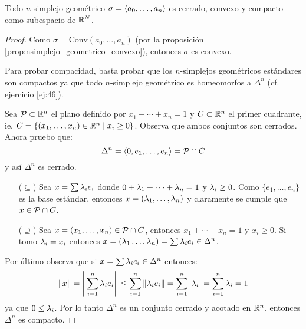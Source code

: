 \begin{ejercicio}\label{ej:45}
  Todo $n$-simplejo geom\'etrico $\sigma=\langle a_0,\ldots,a_n \rangle$ es cerrado, convexo y compacto
  como subespacio de $\mathbb{R}^N$.
\end{ejercicio}
\begin{proof}%
  Como $\sigma=\text{Conv}(a_0,\ldots,a_n)$ (por la proposici\'on \ref{prop:nsimplejo_geometrico_convexo}),
  entonces $\sigma$ es convexo.

  Para probar compacidad, basta probar que los $n$-simplejos geom\'etricos est\'andares son compactos
  ya que todo $n$-simplejo geom\'etrico es homeomorfos a $\Delta^n$ (cf. ejercicio \ref{ej:46}).

  Sea $\mathcal{P}\subset\mathbb{R}^n$ el plano definido por $x_1+\cdots+x_n=1$ y $C\subset\mathbb{R}^n$ el primer cuadrante,
  ie. $C=\{(x_1,\ldots,x_n)\in\mathbb{R}^n\mid x_i\geq 0\}$. Observa que ambos conjuntos son cerrados. Ahora
  pruebo que:
  \[
    \Delta^n=\langle 0,e_1,\ldots,e_n \rangle=\mathcal{P}\cap C
  \]
  y as\'i $\Delta^n$ es cerrado.
  \begin{enumerate}
  \item[($\subseteq$)] Sea $x=\sum\lambda_ie_i$ donde $0+\lambda_1+\cdots+\lambda_n=1$ y $\lambda_i\geq 0$. Como
    $\{e_1,\ldots,e_n\}$ es la base est\'andar, entonces $x=(\lambda_1,\ldots,\lambda_n)$ y claramente se
    cumple que $x\in\mathcal{P}\cap C$.
  \item[($\supseteq$)] Sea $x=(x_1,\ldots,x_n)\in\mathcal{P}\cap C$, entonces $x_1+\cdots+x_n=1$ y $x_i\geq 0$.
    Si tomo $\lambda_i=x_i$ entonces $x=(\lambda_1\ldots,\lambda_n)=\sum\lambda_ie_i\in\Delta^n$.
  \end{enumerate}

  Por \'ultimo observa que si $x=\sum\lambda_ie_i\in\Delta^n$ entonces:
  \[
    \|x\|=
    \left\|\sum_{i=1}^n\lambda_ie_i\right\|\leq
    \sum_{i=1}^n\|\lambda_ie_i\|=
    \sum_{i=1}^n\left| \lambda_i \right|=
    \sum_{i=1}^n\lambda_i=1
  \]
  ya que $0\leq \lambda_i$. Por lo tanto $\Delta^n$ es un conjunto cerrado
  y acotado en $\mathbb{R}^n$, entonces $\Delta^n$ es compacto.
  
  
\end{proof}%

